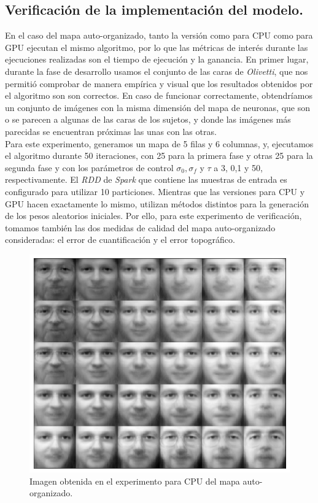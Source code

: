 \subsection{Verificación de la implementación del modelo.}
En el caso del mapa auto-organizado, tanto la versión como para CPU como para GPU ejecutan el mismo algoritmo, por lo que las métricas de interés durante las ejecuciones realizadas son el tiempo de ejecución y la ganancia. En primer lugar, durante la fase de desarrollo usamos el conjunto de las caras de \textit{Olivetti}, que nos permitió comprobar de manera empírica y visual que los resultados obtenidos por el algoritmo son son correctos. En caso de funcionar correctamente, obtendríamos un conjunto de imágenes con la misma dimensión del mapa de neuronas, que son o se parecen a algunas de las caras de los sujetos, y donde las imágenes más parecidas se encuentran próximas las unas con las otras. \\

Para este experimento, generamos un mapa de 5 filas y 6 columnas, y, ejecutamos el algoritmo durante 50 iteraciones, con 25 para la primera fase y otras 25 para la segunda fase y con los parámetros de control $\sigma_0, \sigma_f$ y $\tau$ a 3, 0,1 y 50, respectivamente. El \textit{RDD} de \textit{Spark} que contiene las muestras de entrada es configurado para utilizar 10 particiones. Mientras que las versiones para CPU y GPU hacen exactamente lo mismo, utilizan métodos distintos para la generación de los pesos aleatorios iniciales. Por ello, para este experimento de verificación, tomamos también las dos medidas de calidad del mapa auto-organizado consideradas: el error de cuantificación y el error topográfico.\\

\begin{figure}[ht]
\centering
\includegraphics[scale=0.3]{imagenes/facescpu.png}
\caption{Imagen obtenida en el experimento para CPU del mapa auto-organizado.}
\label{img:somcpu}
\end{figure}

